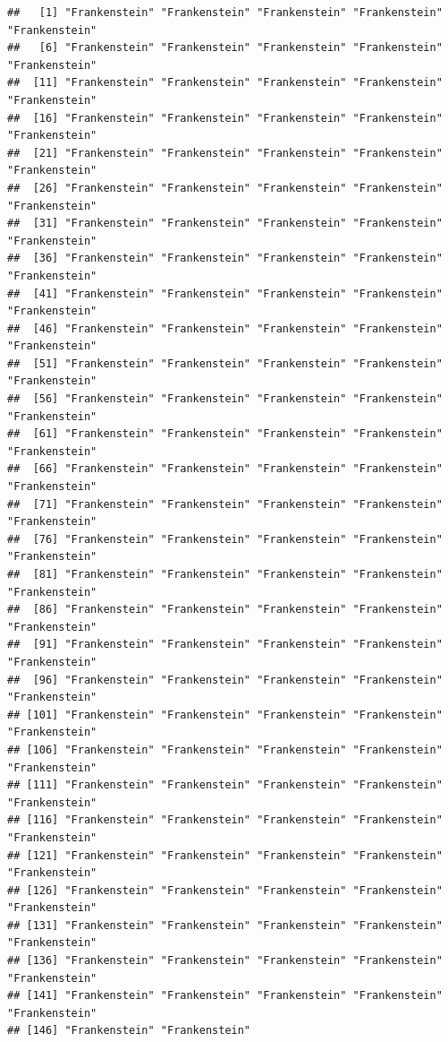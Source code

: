 \documentclass[]{article}
\newenvironment{Shaded}{\begin{snugshade}}{\end{snugshade}}
\newcommand{\KeywordTok}[1]{\textcolor[rgb]{0.13,0.29,0.53}{\textbf{#1}}}
\newcommand{\NormalTok}[1]{#1}
\newcommand{\OperatorTok}[1]{\textcolor[rgb]{0.81,0.36,0.00}{\textbf{#1}}}
\newcommand{\StringTok}[1]{\textcolor[rgb]{0.31,0.60,0.02}{#1}}
\begin{document}
\begin{Shaded}
\end{Shaded}

\begin{verbatim}
##   [1] "Frankenstein" "Frankenstein" "Frankenstein" "Frankenstein" "Frankenstein"
##   [6] "Frankenstein" "Frankenstein" "Frankenstein" "Frankenstein" "Frankenstein"
##  [11] "Frankenstein" "Frankenstein" "Frankenstein" "Frankenstein" "Frankenstein"
##  [16] "Frankenstein" "Frankenstein" "Frankenstein" "Frankenstein" "Frankenstein"
##  [21] "Frankenstein" "Frankenstein" "Frankenstein" "Frankenstein" "Frankenstein"
##  [26] "Frankenstein" "Frankenstein" "Frankenstein" "Frankenstein" "Frankenstein"
##  [31] "Frankenstein" "Frankenstein" "Frankenstein" "Frankenstein" "Frankenstein"
##  [36] "Frankenstein" "Frankenstein" "Frankenstein" "Frankenstein" "Frankenstein"
##  [41] "Frankenstein" "Frankenstein" "Frankenstein" "Frankenstein" "Frankenstein"
##  [46] "Frankenstein" "Frankenstein" "Frankenstein" "Frankenstein" "Frankenstein"
##  [51] "Frankenstein" "Frankenstein" "Frankenstein" "Frankenstein" "Frankenstein"
##  [56] "Frankenstein" "Frankenstein" "Frankenstein" "Frankenstein" "Frankenstein"
##  [61] "Frankenstein" "Frankenstein" "Frankenstein" "Frankenstein" "Frankenstein"
##  [66] "Frankenstein" "Frankenstein" "Frankenstein" "Frankenstein" "Frankenstein"
##  [71] "Frankenstein" "Frankenstein" "Frankenstein" "Frankenstein" "Frankenstein"
##  [76] "Frankenstein" "Frankenstein" "Frankenstein" "Frankenstein" "Frankenstein"
##  [81] "Frankenstein" "Frankenstein" "Frankenstein" "Frankenstein" "Frankenstein"
##  [86] "Frankenstein" "Frankenstein" "Frankenstein" "Frankenstein" "Frankenstein"
##  [91] "Frankenstein" "Frankenstein" "Frankenstein" "Frankenstein" "Frankenstein"
##  [96] "Frankenstein" "Frankenstein" "Frankenstein" "Frankenstein" "Frankenstein"
## [101] "Frankenstein" "Frankenstein" "Frankenstein" "Frankenstein" "Frankenstein"
## [106] "Frankenstein" "Frankenstein" "Frankenstein" "Frankenstein" "Frankenstein"
## [111] "Frankenstein" "Frankenstein" "Frankenstein" "Frankenstein" "Frankenstein"
## [116] "Frankenstein" "Frankenstein" "Frankenstein" "Frankenstein" "Frankenstein"
## [121] "Frankenstein" "Frankenstein" "Frankenstein" "Frankenstein" "Frankenstein"
## [126] "Frankenstein" "Frankenstein" "Frankenstein" "Frankenstein" "Frankenstein"
## [131] "Frankenstein" "Frankenstein" "Frankenstein" "Frankenstein" "Frankenstein"
## [136] "Frankenstein" "Frankenstein" "Frankenstein" "Frankenstein" "Frankenstein"
## [141] "Frankenstein" "Frankenstein" "Frankenstein" "Frankenstein" "Frankenstein"
## [146] "Frankenstein" "Frankenstein"
\end{verbatim}
\end{document}
